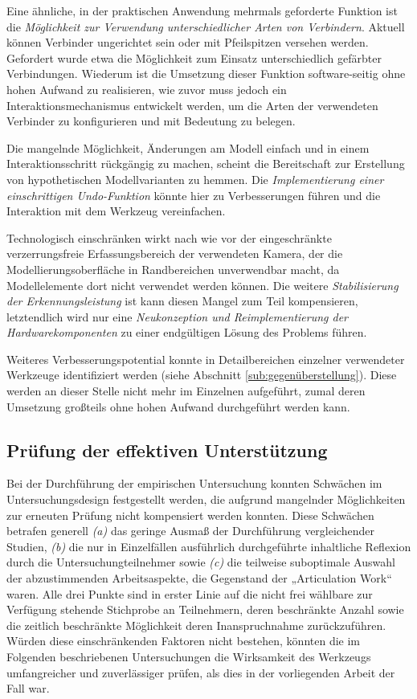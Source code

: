 Eine ähnliche, in der praktischen Anwendung mehrmals geforderte Funktion ist die \emph{Möglichkeit zur Verwendung unterschiedlicher Arten von Verbindern}. Aktuell können Verbinder ungerichtet sein oder mit Pfeilspitzen versehen werden. Gefordert wurde etwa die Möglichkeit zum Einsatz unterschiedlich gefärbter Verbindungen. Wiederum ist die Umsetzung dieser Funktion software-seitig ohne hohen Aufwand zu realisieren, wie zuvor muss jedoch ein Interaktionsmechanismus entwickelt werden, um die Arten der verwendeten Verbinder zu konfigurieren und mit Bedeutung zu belegen.

Die mangelnde Möglichkeit, Änderungen am Modell einfach und in einem Interaktionsschritt rückgängig zu machen, scheint die Bereitschaft zur Erstellung von hypothetischen Modellvarianten zu hemmen. Die \emph{Implementierung einer einschrittigen Undo-Funktion} könnte hier zu Verbesserungen führen und die Interaktion mit dem Werkzeug vereinfachen.

Technologisch einschränken wirkt nach wie vor der eingeschränkte verzerrungsfreie Erfassungsbereich der verwendeten Kamera, der die Modellierungsoberfläche in Randbereichen unverwendbar macht, da Modellelemente dort nicht verwendet werden können. Die weitere \emph{Stabilisierung der Erkennungsleistung} ist kann diesen Mangel zum Teil kompensieren, letztendlich wird nur eine \emph{Neukonzeption und Reimplementierung der Hardwarekomponenten} zu einer endgültigen Lösung des Problems führen.

Weiteres Verbesserungspotential konnte in Detailbereichen einzelner verwendeter Werkzeuge identifiziert werden (siehe Abschnitt \ref{sub:gegenüberstellung}). Diese werden an dieser Stelle nicht mehr im Einzelnen aufgeführt, zumal deren Umsetzung großteils ohne hohen Aufwand durchgeführt werden kann.


\subsection{Prüfung der effektiven Unterstützung} %
\label{sub:prüfung_der_wirksamkeit}

Bei der Durchführung der empirischen Untersuchung konnten Schwächen im Untersuchungsdesign festgestellt werden, die aufgrund mangelnder Möglichkeiten zur erneuten Prüfung nicht kompensiert werden konnten. Diese Schwächen betrafen generell \emph{(a)} das geringe Ausmaß der Durchführung vergleichender Studien, \emph{(b)} die nur in Einzelfällen ausführlich durchgeführte inhaltliche Reflexion durch die Untersuchungteilnehmer sowie \emph{(c)} die teilweise suboptimale Auswahl der abzustimmenden Arbeitsaspekte, die Gegenstand der „Articulation Work“ waren. Alle drei Punkte sind in erster Linie auf die nicht frei wählbare zur Verfügung stehende Stichprobe an Teilnehmern, deren beschränkte Anzahl sowie die zeitlich beschränkte Möglichkeit deren Inanspruchnahme zurückzuführen. Würden diese einschränkenden Faktoren nicht bestehen, könnten die im Folgenden beschriebenen Untersuchungen die Wirksamkeit des Werkzeugs umfangreicher und zuverlässiger prüfen, als dies in der vorliegenden Arbeit der Fall war.

